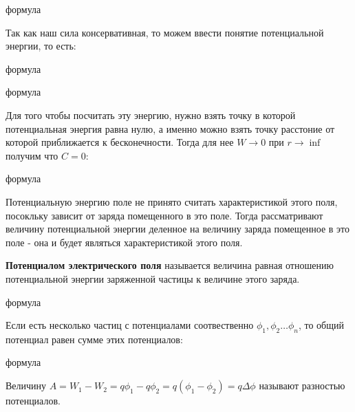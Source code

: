 \documentclass[../main.tex]{subfiles}
\begin{document}
формула

Так как наш сила консервативная, то можем ввести понятие потенциальной энергии, то есть: 

формула

формула 

Для того чтобы посчитать эту энергию, нужно взять точку в которой потенциальная энергия равна нулю, а именно можно взять точку расстоние от которой приближается к бесконечности.
Тогда для нее $W \to 0$ при $r \to \inf$ получим что $C = 0$: 

формула

Потенциальную энергию поле не принято считать характеристикой этого поля, посокльку зависит от заряда помещенного в это поле. 
Тогда рассматривают величину потенциальной энергии деленное на величину заряда помещенное в это поле - она и будет являться характеристикой этого поля.

 \textbf{Потенциалом электрического поля} называется величина равная отношению потенциальной энергии заряженной частицы к величине этого заряда.

формула

Если есть несколько частиц с потенциалами соотвественно $\phi_1, \phi_2 \ldots \phi_n$, то общий потенциал равен сумме этих потенциалов:

формула

 Величину $A = W_1 - W_2 = q\phi_1 - q\phi_2 = q(\phi_1 - \phi_2) = q\Delta \phi$ называют разностью потенциалов.
\end{document}
